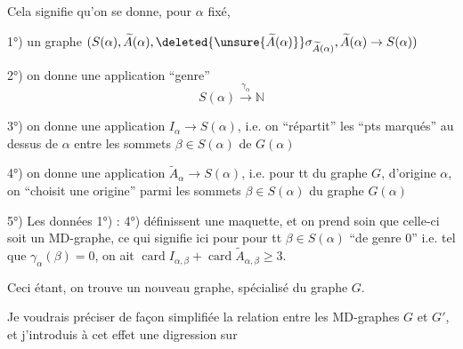 Cela signifie qu'on se donne, pour $\alpha$ fixé,

1°) un graphe  $(S(\alpha),\widetilde A(\alpha),\deleted{\unsure{\widetilde A(\alpha)}}\sigma_{\widetilde A(\alpha)},\widetilde A(\alpha)\to S(\alpha))$

2°) on  donne une application ``genre''
\[
S(\alpha)\xrightarrow{\gamma_\alpha}\mathbb N
\]

3°) on donne une application $I_\alpha\to S(\alpha)$, i.e. on ``répartit'' les  ``pts marqués'' au dessus de $\alpha$  entre les sommets $\beta\in S(\alpha)$ de $G(\alpha)$

4°) on donne une application $\widetilde A_\alpha\to S(\alpha)$, i.e. pour tt  du graphe $G$, d'origine $\alpha$, on  ``choisit une  origine'' parmi les sommets $\beta\in S(\alpha)$ du graphe $G(\alpha)$

5°) Les données 1°) : 4°) définissent une maquette,  et on prend soin que celle-ci soit un MD-graphe,  ce qui signifie ici pour pour tt $\beta\in S(\alpha)$ ``de genre 0'' i.e. tel que $\gamma_\alpha(\beta)=0$, on ait $\operatorname{card}I_{\alpha,\beta}+\operatorname{card}\widetilde A_{\alpha,\beta}\geq 3$.

Ceci étant, on trouve un nouveau graphe,  spécialisé du graphe $G$.

Je voudrais préciser de façon simplifiée la relation entre les MD-graphes $G$ et $G'$, et j'introduis à cet effet une digression sur
